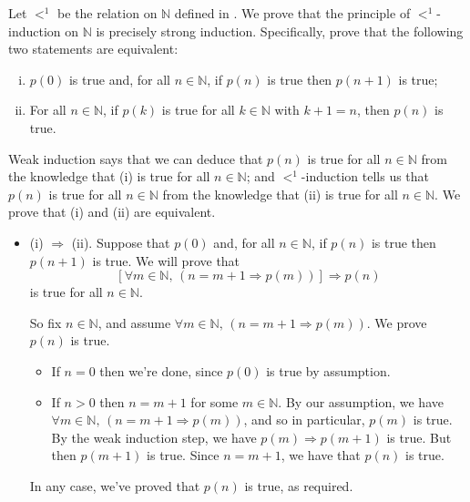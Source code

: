 \begin{example}
\label{exWellFoundedInductionOnNWithSuccessor}
Let ${<}^1$ be the relation on $\mathbb{N}$ defined in . We prove that the principle of ${<}^1$-induction on $\mathbb{N}$ is precisely strong induction. Specifically, prove that the following two statements are equivalent:
\begin{enumerate}[(i)]
\item $p(0)$ is true and, for all $n \in \mathbb{N}$, if $p(n)$ is true then $p(n+1)$ is true;
\item For all $n \in \mathbb{N}$, if $p(k)$ is true for all $k \in \mathbb{N}$ with $k+1=n$, then $p(n)$ is true.
\end{enumerate}

Weak induction says that we can deduce that $p(n)$ is true for all $n \in \mathbb{N}$ from the knowledge that (i) is true for all $n \in \mathbb{N}$; and ${<}^1$-induction tells us that $p(n)$ is true for all $n \in \mathbb{N}$ from the knowledge that (ii) is true for all $n \in \mathbb{N}$. We prove that (i) and (ii) are equivalent.

\begin{itemize}
\item (i) $\Rightarrow$ (ii). Suppose that $p(0)$ and, for all $n \in \mathbb{N}$, if $p(n)$ is true then $p(n+1)$ is true. We will prove that
\[ [\forall m \in \mathbb{N},\, (n=m+1 \Rightarrow p(m))] \Rightarrow p(n) \]
is true for all $n \in \mathbb{N}$.

So fix $n \in \mathbb{N}$, and assume $\forall m \in \mathbb{N},\, (n=m+1 \Rightarrow p(m))$. We prove $p(n)$ is true.
\begin{itemize}
\item If $n=0$ then we're done, since $p(0)$ is true by assumption.
\item If $n>0$ then $n=m+1$ for some $m \in \mathbb{N}$. By our assumption, we have $\forall m \in \mathbb{N},\, (n=m+1 \Rightarrow p(m))$, and so in particular, $p(m)$ is true. By the weak induction step, we have $p(m) \Rightarrow p(m+1)$ is true. But then $p(m+1)$ is true. Since $n=m+1$, we have that $p(n)$ is true.
\end{itemize}
In any case, we've proved that $p(n)$ is true, as required.


\end{itemize}
\end{example}
